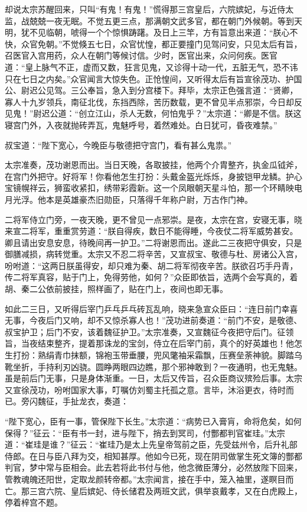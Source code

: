 \documentclass[12pt]{lsbook}
\begin{document}
却说太宗苏醒回来，只叫“有鬼！有鬼！”慌得那三宫皇后，六院嫔妃，与近侍太监，战兢兢一夜无眠。不觉五更三点，那满朝文武多官，都在朝门外候朝。等到天明，犹不见临朝，唬得一个个惊惧踌躇。及日上三竿，方有旨意出来道：“朕心不快，众官免朝。”不觉倏五七日，众官忧惶，都正要撞门见驾问安，只见太后有旨，召医官入宫用药，众人在朝门等候讨信。少时，医官出来，众问何疾。医官道：“皇上脉气不正，虚而又数，狂言见鬼，又诊得十动一代，五脏无气，恐不讳只在七日之内矣。”众官闻言大惊失色。正怆惶间，又听得太后有旨宣徐茂功、护国公、尉迟公见驾。三公奉旨，急入到分宫楼下。拜毕，太宗正色强言道：“贤卿，寡人十九岁领兵，南征北伐，东挡西除，苦历数载，更不曾见半点邪崇，今日却反见鬼！”尉迟公道：“创立江山，杀人无数，何怕鬼乎？”太宗道：“卿是不信。朕这寝宫门外，入夜就抛砖弄瓦，鬼魅呼号，着然难处。白日犹可，昏夜难禁。”

叔宝道：“陛下宽心，今晚臣与敬德把守宫门，看有甚么鬼祟。”

太宗准奏，茂功谢恩而出。当日天晚，各取披挂，他两个介胄整齐，执金瓜钺斧，在宫门外把守。好将军！你看他怎生打扮：头戴金盔光烁烁，身披铠甲龙鳞。护心宝镜幌祥云，狮蛮收紧扣，绣带彩霞新。这一个凤眼朝天星斗怕，那一个环睛映电月光浮。他本是英雄豪杰旧勋臣，只落得千年称户尉，万古作门神。

二将军侍立门旁，一夜天晚，更不曾见一点邪崇。是夜，太宗在宫，安寝无事，晓来宣二将军，重重赏劳道：“朕自得疾，数日不能得睡，今夜仗二将军威势甚安。卿且请出安息安息，待晚间再一护卫。”二将谢恩而出。遂此二三夜把守俱安，只是御膳减损，病转觉重。太宗又不忍二将辛苦，又宣叔宝、敬德与杜、房诸公入宫，吩咐道：“这两日朕虽得安，却只难为秦、胡二将军彻夜辛苦。朕欲召巧手丹青，传二将军真容，贴于门上，免得劳他，如何？”众臣即依旨，选两个会写真的，着胡、秦二公依前披挂，照样画了，贴在门上，夜间也即无事。

如此二三日，又听得后宰门乒乓乒乓砖瓦乱响，晓来急宣众臣曰：“连日前门幸喜无事，今夜后门又响，却不又惊杀寡人也！”茂功进前奏道：“前门不安，是敬德、叔宝护卫；后门不安，该着魏征护卫。”太宗准奏，又宣魏征今夜把守后门。征领旨，当夜结束整齐，提着那诛龙的宝剑，侍立在后宰门前，真个的好英雄也！他怎生打扮：熟绢青巾抹额，锦袍玉带垂腰，兜风氅袖采霜飘，压赛垒荼神貌。脚踏乌靴坐折，手持利刃凶骁。圆睁两眼四边瞧，那个邪神敢到？一夜通明，也无鬼魅。虽是前后门无事，只是身体渐重。一日，太后又传旨，召众臣商议殡殓后事。太宗又宣徐茂功，吩咐国家大事，叮嘱仿刘蜀主托孤之意。言毕，沐浴更衣，待时而已。旁闪魏征，手扯龙衣，奏道：

“陛下宽心，臣有一事，管保陛下长生。”太宗道：“病势已入膏肓，命将危矣，如何保得？”征云：“臣有书一封，进与陛下，捎去到冥司，付酆都判官崔珪。”太宗道：“崔珪是谁？”征云：“崔珪乃是太上先皇帝驾前之臣，先受兹州令，后升礼部侍郎。在日与臣八拜为交，相知甚厚。他如今已死，现在阴司做掌生死文簿的酆都判官，梦中常与臣相会。此去若将此书付与他，他念微臣薄分，必然放陛下回来，管教魂魄还阳世，定取龙颜转帝都。”太宗闻言，接在手中，笼入袖里，遂瞑目而亡。那三宫六院、皇后嫔妃、侍长储君及两班文武，俱举哀戴孝，又在白虎殿上，停着梓宫不题。
\end{document}
